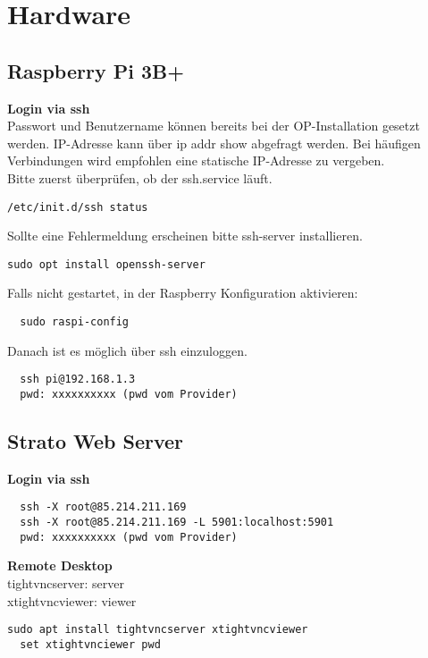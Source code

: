 \section{Hardware}

\subsection{Raspberry Pi 3B+}
\textbf{Login via ssh}\\
Passwort und Benutzername können bereits bei der OP-Installation gesetzt werden. IP-Adresse kann über ip addr show abgefragt werden. Bei häufigen Verbindungen wird empfohlen eine statische IP-Adresse zu vergeben.\\

Bitte zuerst überprüfen, ob der ssh.service läuft.
\begin{verbatim}
/etc/init.d/ssh status
\end{verbatim}
Sollte eine Fehlermeldung erscheinen bitte ssh-server installieren.
\begin{verbatim}
sudo opt install openssh-server
\end{verbatim}
Falls nicht gestartet, in der Raspberry Konfiguration aktivieren:
\begin{verbatim}
  sudo raspi-config
\end{verbatim}
Danach ist es möglich über ssh einzuloggen.
\begin{verbatim}
  ssh pi@192.168.1.3
  pwd: xxxxxxxxxx (pwd vom Provider)
\end{verbatim}

\subsection{Strato Web Server}
\textbf{Login via ssh}
\begin{verbatim}
  ssh -X root@85.214.211.169
  ssh -X root@85.214.211.169 -L 5901:localhost:5901
  pwd: xxxxxxxxxx (pwd vom Provider)
\end{verbatim}
\textbf{Remote Desktop}\\
tightvncserver: server\\
xtightvncviewer: viewer
\begin{verbatim}sudo apt install tightvncserver xtightvncviewer
  set xtightvnciewer pwd
\end{verbatim}

